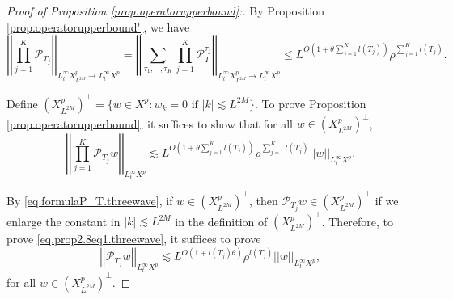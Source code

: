\begin{proof}[Proof of Proposition \ref{prop.operatorupperbound}:] By Proposition \ref{prop.operatorupperbound'}, we have
\begin{equation}
    \left|\left|\prod_{j=1}^K\mathcal{P}_{T_j}\right|\right|_{L_t^{\infty}X^p_{L^{2M}}\rightarrow L_t^{\infty}X^p}=\left|\left|\sum_{\tau_1,\cdots,\tau_K}\prod_{j=1}^K\mathcal{P}^{\tau_j}_{T}\right|\right|_{L_t^{\infty}X^{p}_{L^{2M}}\rightarrow L_t^{\infty}X^{p}}\le L^{O\left(1+\theta \sum_{j=1}^K l(T_j)\right)} \rho^{\sum_{j=1}^K l(T_j)}.
\end{equation}

Define $\left(X^{p}_{L^{2M}}\right)^{\perp}=\{w\in X^p: w_k=0\text{ if }|k|\lesssim L^{2M}\}$. To prove Proposition \ref{prop.operatorupperbound}, it suffices to show that for all $w\in \left(X^{p}_{L^{2M}}\right)^{\perp}$,
\begin{equation}\label{eq.prop2.8eq1.threewave}
    \left|\left|\prod_{j=1}^K\mathcal{P}_{T_j}w\right|\right|_{L_t^{\infty}X^p}\lesssim L^{O\left(1+\theta \sum_{j=1}^K l(T_j)\right)} \rho^{\sum_{j=1}^K l(T_j)} \left|\left|w\right|\right|_{L_t^{\infty}X^p}.
\end{equation}

By \eqref{eq.formulaP_T.threewave}, if $w\in \left(X^{p}_{L^{2M}}\right)^{\perp}$, then $\mathcal{P}_{T_j} w\in \left(X^{p}_{L^{2M}}\right)^{\perp}$ if we enlarge the constant in $|k|\lesssim L^{2M}$ in the definition of $\left(X^{p}_{L^{2M}}\right)^{\perp}$. Therefore, to prove \eqref{eq.prop2.8eq1.threewave}, it suffices to prove
\begin{equation}\label{eq.prop2.8eq2.threewave}
    \left|\left|\mathcal{P}_{T_j}w\right|\right|_{L_t^{\infty}X^p}\lesssim L^{O(1+l(T_j)\theta)} \rho^{l(T_j)} \left|\left|w\right|\right|_{L_t^{\infty}X^p},
\end{equation}
for all $w\in \left(X^{p}_{L^{2M}}\right)^{\perp}$.


\end{proof}
